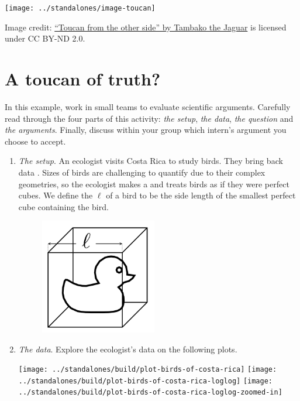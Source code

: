 \documentclass[../main.tex]{subfiles}
\begin{document}
 

\centerline{\texttt{[image: ../standalones/image-toucan]}}

{\footnotesize Image credit: \href{https://www.flickr.com/photos/8070463@N03/9324653982}{``Toucan from the other side'' by Tambako the Jaguar} is licensed under CC BY-ND 2.0.}

\section{A toucan of truth?}
\begin{example} \label{ex:toucan}
  In this example, work in small teams to evaluate scientific arguments. Carefully read through the four parts of this activity: \emph{the setup}, \emph{the data}, \emph{the question} and \emph{the arguments}. Finally, discuss within your group which intern's argument you choose to accept.

  \begin{enumerate}[wide, label=(\arabic*)]
    \item \emph{The setup}. An ecologist visits Costa Rica to study birds. They bring back data . 
      Sizes of birds are challenging to quantify due to their complex geometries, so the ecologist makes a  and treats birds as if they were perfect cubes. We define the  \(\ell\) of a bird to be the side length of the smallest perfect cube containing the bird.

      \begin{figure}[H]
        \centering
        \includegraphics[width=2in]{../standalones/image-bird-cube.png}
      \end{figure}

    \item \emph{The data}. Explore the ecologist's data on the following plots.

      \centerline{
        \texttt{[image: ../standalones/build/plot-birds-of-costa-rica]}
        \texttt{[image: ../standalones/build/plot-birds-of-costa-rica-loglog]}
        \texttt{[image: ../standalones/build/plot-birds-of-costa-rica-loglog-zoomed-in]}
      }


\end{enumerate}
\end{example}
\end{document}
